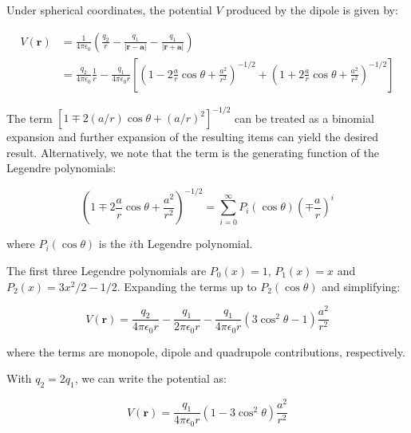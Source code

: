 \documentclass[12pt]{article}
\begin{document}
Under spherical coordinates, the potential $V$ produced by the dipole is given by:

\begin{equation}
\begin{split}
    V(\mathbf{r}) &= \frac{1}{4\pi\epsilon_{0}} \left( \frac{q_{2}}{r} - \frac{q_{1}}{\left\lvert \mathbf{r} - \mathbf{a} \right\rvert} - \frac{q_{1}}{\left\lvert \mathbf{r} + \mathbf{a} \right\rvert} \right) \\
    &= \frac{q_{2}}{4\pi\epsilon_{0}} \frac{1}{r} - \frac{q_{1}}{4\pi\epsilon_{0}r} \left[ \left( 1 - 2\frac{a}{r} \cos{\theta} + \frac{a^{2}}{r^{2}} \right)^{-1/2} + \left( 1 + 2\frac{a}{r} \cos{\theta} + \frac{a^{2}}{r^{2}} \right)^{-1/2} \right]
\end{split}
\end{equation}

The term $[1 \mp 2 (a/r) \cos{\theta} + (a/r)^{2}]^{-1/2}$ can be treated as a binomial expansion and further expansion of the resulting items can yield the desired result. Alternatively, we note that the term is the generating function of the Legendre polynomials:

\begin{equation}
    \left( 1 \mp 2\frac{a}{r} \cos{\theta} + \frac{a^{2}}{r^{2}} \right)^{-1/2} = \sum_{i=0}^{\infty} P_{i}(\cos{\theta}) \left( \mp \frac{a}{r} \right)^{i}
\end{equation}

where $P_{i}(\cos{\theta})$ is the $i$th Legendre polynomial.

The first three Legendre polynomials are $P_{0}(x) = 1$, $P_{1}(x) = x$ and $P_{2}(x) = 3x^{2}/2 - 1/2$. Expanding the terms up to $P_{2}(\cos{\theta})$ and simplifying:

\begin{equation}
    V(\mathbf{r}) = \frac{q_{2}}{4\pi\epsilon_{0}r} - \frac{q_{1}}{2\pi\epsilon_{0}r} - \frac{q_{1}}{4\pi\epsilon_{0}r} (3\cos^{2}{\theta} - 1) \frac{a^{2}}{r^{2}}
\end{equation}

where the terms are monopole, dipole and quadrupole contributions, respectively.

With $q_{2} = 2q_{1}$, we can write the potential as:

\begin{equation}
    V(\mathbf{r}) = \frac{q_{1}}{4\pi\epsilon_{0}r} (1 - 3\cos^{2}{\theta}) \frac{a^{2}}{r^{2}}
\end{equation}
\end{document}
